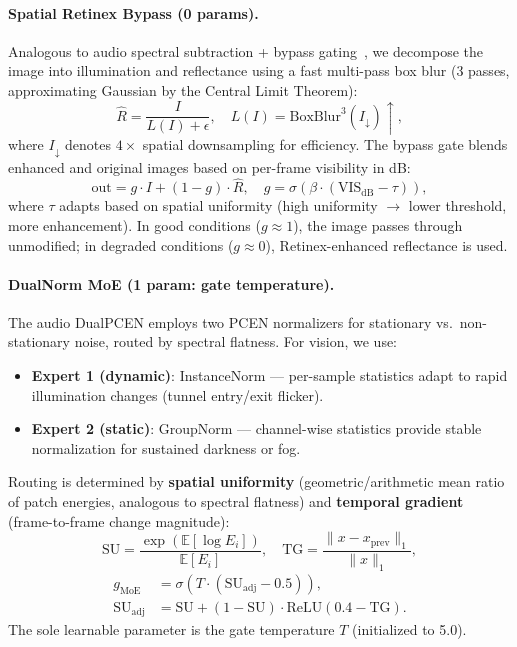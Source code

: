 \documentclass[10pt,twocolumn,letterpaper]{article}
\begin{document}
\paragraph{Spatial Retinex Bypass (0 params).}
Analogous to audio spectral subtraction + bypass gating~\cite{choi2026ncssm}, we decompose the image into illumination and reflectance using a fast multi-pass box blur (3 passes, approximating Gaussian by the Central Limit Theorem):
\begin{equation}
\hat{R} = \frac{I}{L(I) + \epsilon}, \quad L(I) = \text{BoxBlur}^3(I_\downarrow) \uparrow,
\end{equation}
where $I_\downarrow$ denotes $4\times$ spatial downsampling for efficiency.
The bypass gate blends enhanced and original images based on per-frame visibility in dB:
\begin{equation}
\text{out} = g \cdot I + (1 - g) \cdot \hat{R}, \quad
g = \sigma\!\left(\beta \cdot (\text{VIS}_{\text{dB}} - \tau)\right),
\end{equation}
where $\tau$ adapts based on spatial uniformity (high uniformity $\to$ lower threshold, more enhancement).
In good conditions ($g \approx 1$), the image passes through unmodified; in degraded conditions ($g \approx 0$), Retinex-enhanced reflectance is used.

\paragraph{DualNorm MoE (1 param: gate temperature).}
The audio DualPCEN employs two PCEN normalizers for stationary vs.\ non-stationary noise, routed by spectral flatness.
For vision, we use:
\begin{itemize}
\setlength\itemsep{0pt}
\item \textbf{Expert 1 (dynamic)}: InstanceNorm --- per-sample statistics adapt to rapid illumination changes (tunnel entry/exit flicker).
\item \textbf{Expert 2 (static)}: GroupNorm --- channel-wise statistics provide stable normalization for sustained darkness or fog.
\end{itemize}
Routing is determined by \textbf{spatial uniformity} (geometric/arithmetic mean ratio of patch energies, analogous to spectral flatness) and \textbf{temporal gradient} (frame-to-frame change magnitude):
\begin{equation}
\text{SU} = \frac{\exp(\mathbb{E}[\log E_i])}{\mathbb{E}[E_i]}, \quad
\text{TG} = \frac{\|x - x_{\text{prev}}\|_1}{\|x\|_1},
\end{equation}
\begin{align}
g_{\text{MoE}} &= \sigma\!\left(T \cdot (\text{SU}_{\text{adj}} - 0.5)\right), \nonumber \\
\text{SU}_{\text{adj}} &= \text{SU} + (1{-}\text{SU}) \cdot \text{ReLU}(0.4{-}\text{TG}).
\end{align}
The sole learnable parameter is the gate temperature $T$ (initialized to 5.0).
\end{document}
